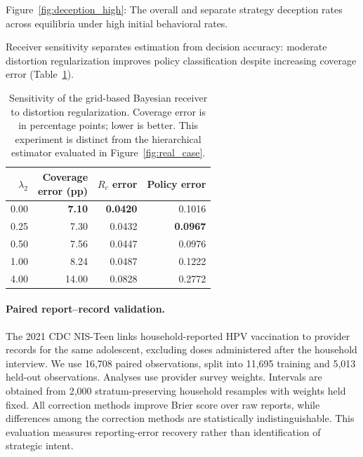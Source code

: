 \documentclass[sigconf,review]{acmart}
\begin{document}
Figure~\ref{fig:deception_high}: The overall and separate strategy deception rates across equilibria under high initial behavioral rates.


Receiver sensitivity separates estimation from decision accuracy: moderate distortion regularization improves policy classification despite increasing coverage error (Table~\ref{tab:receiver-sensitivity}).

\begin{table}[tbp]
\centering
\caption{Sensitivity of the grid-based Bayesian receiver to
distortion regularization. Coverage error is in percentage
points; lower is better. This experiment is distinct from
the hierarchical estimator evaluated in
Figure~\ref{fig:real_case}.}
\label{tab:receiver-sensitivity}
\small
\setlength{\tabcolsep}{4pt}
\begin{tabular}{@{}rrrr@{}}
\toprule
$\lambda_2$
& \shortstack{Coverage\\error (pp)}
& $R_c$ error
& Policy error \\
\midrule
0.00 & \textbf{7.10} & \textbf{0.0420} & 0.1016 \\
0.25 & 7.30          & 0.0432          & \textbf{0.0967} \\
0.50 & 7.56          & 0.0447          & 0.0976 \\
1.00 & 8.24          & 0.0487          & 0.1222 \\
4.00 & 14.00         & 0.0828          & 0.2772 \\
\bottomrule
\end{tabular}
\end{table}


\paragraph{Paired report--record validation.} The 2021 CDC NIS-Teen links household-reported HPV vaccination to provider records for the same adolescent, excluding doses administered after the household interview. We use 16,708 paired observations, split into 11,695 training and 5,013 held-out observations. Analyses use provider survey weights. Intervals are obtained from 2,000 stratum-preserving household resamples with weights held fixed. All correction methods improve Brier score over raw reports, while differences among the correction methods are statistically indistinguishable. This evaluation measures reporting-error recovery rather than identification of strategic intent.
\end{document}

